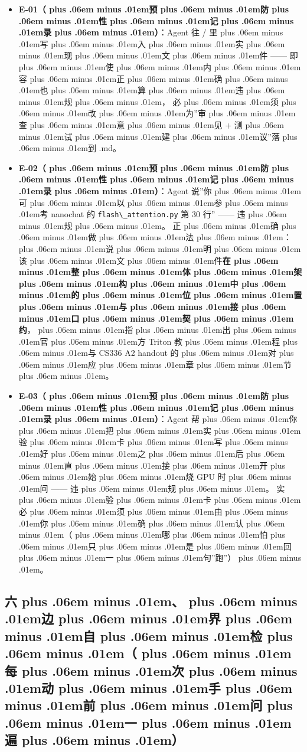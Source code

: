 \documentclass[
]{article}
\newcommand{\passthrough}[1]{#1}
\providecommand{\tightlist}{%
  \setlength{\itemsep}{0pt}\setlength{\parskip}{0pt}}
\def\zh#1{{\zhfont #1}}
\def\codezh#1{{\zhmonofont #1}}
\def\zhglue{\hskip0pt plus .06em minus .01em}
\begin{document}
\begin{itemize}
\tightlist
\item
  \textbf{E-01\zh{（\zhglue 预\zhglue 防\zhglue 性\zhglue 记\zhglue 录\zhglue ）}}\zh{：}Agent \zh{往} \passthrough{\codezh{{\zh{手}}{\zh{写}}/}} \zh{里\zhglue 写\zhglue 入\zhglue 实\zhglue 现\zhglue 文\zhglue 件} ------ \zh{即\zhglue 使\zhglue 内\zhglue 容\zhglue 正\zhglue 确\zhglue 也\zhglue 算\zhglue 违\zhglue 规\zhglue ，} \zh{必\zhglue 须\zhglue 改\zhglue 为}''\zh{审\zhglue 查\zhglue 意\zhglue 见} + \zh{测\zhglue 试\zhglue 建\zhglue 议}''\zh{落\zhglue 到} \passthrough{\codezh{{\zh{判}}{\zh{卷}}{\zh{记}}{\zh{录}}.md}}\zh{。}
\item
  \textbf{E-02\zh{（\zhglue 预\zhglue 防\zhglue 性\zhglue 记\zhglue 录\zhglue ）}}\zh{：}Agent \zh{说}''\zh{你\zhglue 可\zhglue 以\zhglue 参\zhglue 考} nanochat \zh{的} \passthrough{\lstinline!flash\_attention.py!} \zh{第} 30 \zh{行}'' ------ \zh{违\zhglue 规\zhglue 。} \zh{正\zhglue 确\zhglue 做\zhglue 法\zhglue ：\zhglue 说\zhglue 明\zhglue 该\zhglue 文\zhglue 件}\textbf{\zh{在\zhglue 整\zhglue 体\zhglue 架\zhglue 构\zhglue 中\zhglue 的\zhglue 位\zhglue 置\zhglue 与\zhglue 接\zhglue 口\zhglue 契\zhglue 约}}\zh{，\zhglue 指\zhglue 出\zhglue 官\zhglue 方} Triton \zh{教\zhglue 程\zhglue 与} CS336 A2 handout \zh{的\zhglue 对\zhglue 应\zhglue 章\zhglue 节\zhglue 。}
\item
  \textbf{E-03\zh{（\zhglue 预\zhglue 防\zhglue 性\zhglue 记\zhglue 录\zhglue ）}}\zh{：}Agent \zh{帮\zhglue 你\zhglue 把\zhglue 实\zhglue 验\zhglue 卡\zhglue 写\zhglue 好\zhglue 之\zhglue 后\zhglue 直\zhglue 接\zhglue 开\zhglue 始\zhglue 烧} GPU \zh{时\zhglue 间} ------ \zh{违\zhglue 规\zhglue 。} \zh{实\zhglue 验\zhglue 卡\zhglue 必\zhglue 须\zhglue 由\zhglue 你\zhglue 确\zhglue 认\zhglue （\zhglue 哪\zhglue 怕\zhglue 只\zhglue 是\zhglue 回\zhglue 一\zhglue 句}''\zh{跑}''\zh{）\zhglue 。}
\end{itemize}

\subsection{\zh{六\zhglue 、\zhglue 边\zhglue 界\zhglue 自\zhglue 检\zhglue （\zhglue 每\zhglue 次\zhglue 动\zhglue 手\zhglue 前\zhglue 问\zhglue 一\zhglue 遍\zhglue ）}}\label{ux516dux8fb9ux754cux81eaux68c0ux6bcfux6b21ux52a8ux624bux524dux95eeux4e00ux904d}
\end{document}
